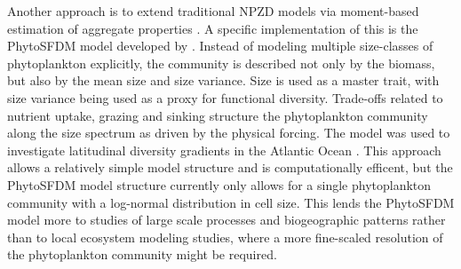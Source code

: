 Another approach is to extend traditional NPZD models via moment-based estimation of aggregate properties \citep{Merico2009}.
A specific implementation of this is the PhytoSFDM model developed by \citet{Acevedo-Trejos2016}. 
Instead of modeling multiple size-classes of phytoplankton explicitly, 
the community is described not only by the biomass, but also by the mean size and size variance. Size is used as a master trait, with size variance being used as a proxy for functional diversity. Trade-offs related to nutrient uptake, grazing and sinking structure the phytoplankton community along the size spectrum as driven by the physical forcing. The model was used to investigate latitudinal diversity gradients in the Atlantic Ocean \citep{Acevedo-Trejos2018}. This approach allows a relatively simple model structure and is computationally efficent, but the PhytoSFDM model structure currently only allows for a single phytoplankton community with a log-normal distribution in cell size. This lends the PhytoSFDM model more to studies of large scale processes and biogeographic patterns rather than to local ecosystem modeling studies, where a more fine-scaled resolution of the phytoplankton community might be required.

